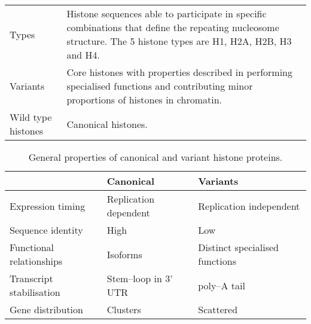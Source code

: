 \begin{table*}
\begin{tabular}{F p{\dimexpr(\textwidth--4\tabcolsep)}}
      \addlinespace
	  Types &
	  Histone sequences able to participate in specific combinations 
	  that define the repeating nucleosome structure. 
	  The 5 histone types are H1, H2A, H2B, H3 and H4.
	  \\
      \addlinespace
	  Variants &
	  Core histones with properties described in  
	  performing specialised functions and contributing minor proportions of histones in chromatin. \\
      \addlinespace
	  Wild type histones &
	  Canonical histones. \\
      \bottomrule
    \end{tabular}
  \end{table*}

  \begin{table*}
    \caption{General properties of canonical and variant histone proteins.}
    \label{tab:typical-histone-differences}
    \centering
    \begin{tabular}{l l l}
      \toprule
      \null                     & Canonical             & Variants \\
      \midrule
      Expression timing         & Replication dependent & Replication independent \\
      Sequence identity         & High                  & Low \\
      Functional relationships  & Isoforms              & Distinct specialised functions \\
      Transcript stabilisation  & Stem--loop in 3' UTR  & poly--A tail \\
      Gene distribution         & Clusters              & Scattered \\
      \bottomrule
    \end{tabular}
  \end{table*}

